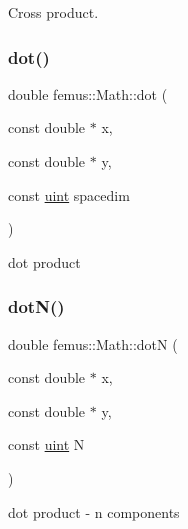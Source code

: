 Cross product. 

\mbox{\label{namespacefemus_1_1_math_a804b6e7af3d40fe1c09928089b7dfccb}} 
\subsubsection{\texorpdfstring{dot()}{dot()}}
{\footnotesize\ttfamily double femus\+::\+Math\+::dot (\begin{DoxyParamCaption}\item[{const double $\ast$}]{x,  }\item[{const double $\ast$}]{y,  }\item[{const \mbox{\hyperlink{_typedefs_8hpp_a91ad9478d81a7aaf2593e8d9c3d06a14}{uint}}}]{spacedim }\end{DoxyParamCaption})\hspace{0.3cm}{\ttfamily [inline]}}



dot product 

\mbox{\label{namespacefemus_1_1_math_af3228f411dbbd6dd3a4ece9f5641b462}} 
\subsubsection{\texorpdfstring{dot\+N()}{dotN()}}
{\footnotesize\ttfamily double femus\+::\+Math\+::dotN (\begin{DoxyParamCaption}\item[{const double $\ast$}]{x,  }\item[{const double $\ast$}]{y,  }\item[{const \mbox{\hyperlink{_typedefs_8hpp_a91ad9478d81a7aaf2593e8d9c3d06a14}{uint}}}]{N }\end{DoxyParamCaption})\hspace{0.3cm}{\ttfamily [inline]}}



dot product -\/ n components 

\mbox{\label{namespacefemus_1_1_math_a7c61609663b61259ec67232f7eba0d3c}} 
